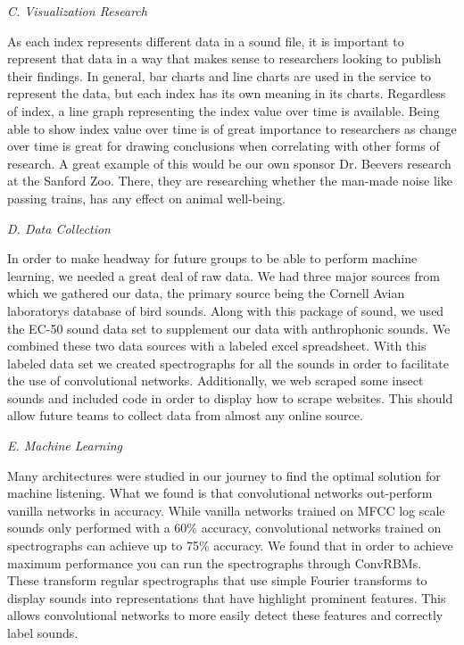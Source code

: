 \begin{flushleft}
\noindent\textit{C. Visualization Research}\par
As each index represents different data in a sound file, it is important to represent that data in a way that makes sense to researchers looking to publish their findings. In general, bar charts and line charts are used in the service to represent the data, but each index has its own meaning in its charts. Regardless of index, a line graph representing the index value over time is available. Being able to show index value over time is of great importance to researchers as change over time is great for drawing conclusions when correlating with other forms of research. A great example of this would be our own sponsor Dr. Beever\textquotesingle s research at the Sanford Zoo. There, they are researching whether the man-made noise like passing trains, has any effect on animal well-being.

\noindent\textit{D. Data Collection}\par
In order to make headway for future groups to be able to perform machine learning, we needed a great deal of raw data. We had three major sources from which we gathered our data, the primary source being the Cornell Avian laboratory\textquotesingle s database of bird sounds. Along with this package of sound, we used the EC-50 sound data set to supplement our data with anthrophonic sounds. We combined these two data sources with a labeled excel spreadsheet. With this labeled data set we created spectrographs for all the sounds in order to facilitate the use of convolutional networks. Additionally, we web scraped some insect sounds and included code in order to display how to scrape websites. This should allow future teams to collect data from almost any online source.

\noindent\textit{E. Machine Learning}\par
Many architectures were studied in our journey to find the optimal solution for machine listening. What we found is that convolutional networks out-perform vanilla networks in accuracy. While vanilla networks trained on MFCC log scale sounds only performed with a 60\% accuracy, convolutional networks trained on spectrographs can achieve up to 75\% accuracy. We found that in order to achieve maximum performance you can run the spectrographs through ConvRBMs. These transform regular spectrographs that use simple Fourier transforms to display sounds into representations that have highlight prominent features. This allows convolutional networks to more easily detect these features and correctly label sounds.

\end{flushleft}
